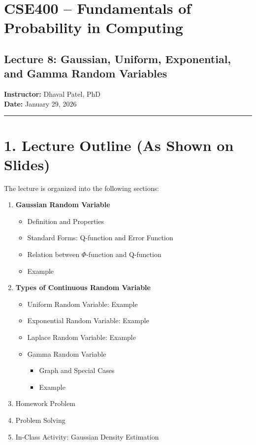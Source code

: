 \documentclass[12pt]{article}
\begin{document}
\section*{CSE400 – Fundamentals of Probability in Computing}

\subsection*{Lecture 8: Gaussian, Uniform, Exponential, and Gamma Random Variables}

\textbf{Instructor:} Dhaval Patel, PhD \\
\textbf{Date:} January 29, 2026

\hrule
\vspace{1em}

\section*{1. Lecture Outline (As Shown on Slides)}

The lecture is organized into the following sections:

\begin{enumerate}
    \item \textbf{Gaussian Random Variable}
    \begin{itemize}
        \item Definition and Properties
        \item Standard Forms: Q-function and Error Function
        \item Relation between $\Phi$-function and Q-function
        \item Example
    \end{itemize}

    \item \textbf{Types of Continuous Random Variable}
    \begin{itemize}
        \item Uniform Random Variable: Example
        \item Exponential Random Variable: Example
        \item Laplace Random Variable: Example
        \item Gamma Random Variable
        \begin{itemize}
            \item Graph and Special Cases
            \item Example
        \end{itemize}
    \end{itemize}

    \item Homework Problem
    \item Problem Solving
    \item In-Class Activity: Gaussian Density Estimation
\end{enumerate}
\end{document}
